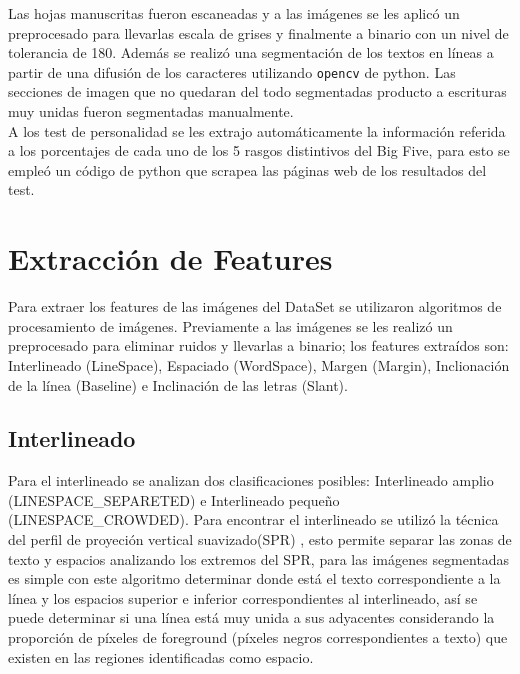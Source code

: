 \documentclass[10pt, a4paper]{article}
\begin{document}
        Las hojas manuscritas fueron escaneadas y a las im\'agenes se les aplic\'o un preprocesado para llevarlas escala de grises y finalmente a binario con un nivel de tolerancia de 180. Adem\'as se 
        realiz\'o una segmentaci\'on de los textos en l\'ineas a partir de una difusi\'on de los caracteres utilizando \texttt{opencv} de python. Las secciones de imagen que no quedaran 
        del todo segmentadas producto a escrituras muy unidas fueron segmentadas manualmente.\\ 

        A los test de personalidad se les extrajo autom\'aticamente la informaci\'on referida a los porcentajes de cada uno 
        de los 5 rasgos distintivos del Big Five, para esto se emple\'o un c\'odigo de python que scrapea las p\'aginas web de los resultados del test.\\ 

    \section{Extracci\'on de Features}
        Para extraer los features de las im\'agenes del DataSet se utilizaron algoritmos de procesamiento de im\'agenes. Previamente a las im\'agenes se les realiz\'o un 
        preprocesado para eliminar ruidos y llevarlas a binario; los features extra\'idos son: Interlineado (LineSpace), Espaciado (WordSpace), Margen (Margin), Inclionaci\'on de la l\'inea (Baseline) e Inclinaci\'on de las letras (Slant). 

        \subsection{Interlineado} 

            Para el interlineado se analizan dos clasificaciones posibles: Interlineado amplio (LINESPACE\_SEPARETED) e Interlineado peque\~no (LINESPACE\_CROWDED). Para encontrar el interlineado se utiliz\'o la t\'ecnica del perfil 
            de proyeci\'on vertical suavizado(SPR) \cite{20}, esto permite separar las zonas de texto y espacios analizando los extremos del SPR, para las im\'agenes segmentadas es simple con este algoritmo determinar donde est\'a el texto correspondiente a la l\'inea y los espacios superior e inferior
            correspondientes al interlineado, as\'i se puede determinar si una l\'inea est\'a muy unida a sus adyacentes considerando la proporci\'on de p\'ixeles de foreground (p\'ixeles negros correspondientes a texto) que existen en 
            las regiones identificadas como espacio. \\
\end{document}
